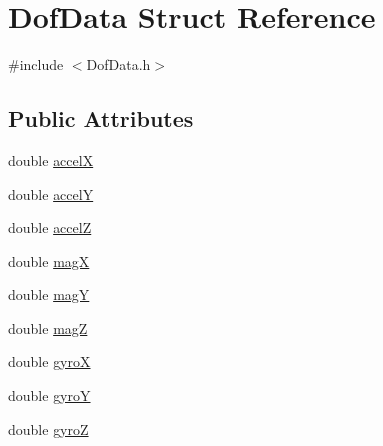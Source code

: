 \hypertarget{struct_dof_data}{\section{Dof\-Data Struct Reference}
\label{struct_dof_data}
}


{\ttfamily \#include $<$Dof\-Data.\-h$>$}

\subsection*{Public Attributes}
\begin{DoxyCompactItemize}
\item 
double \hyperlink{struct_dof_data_a428cfa39fa295506315a15dd7aec6af9}{accel\-X}
\item 
double \hyperlink{struct_dof_data_aff5dae3fd5404b3655b2848b720e6d4e}{accel\-Y}
\item 
double \hyperlink{struct_dof_data_a2be73a3c7df7e25639b04d8807cb738f}{accel\-Z}
\item 
double \hyperlink{struct_dof_data_aa246a750759f0e35fc1c6d51bf3171c9}{mag\-X}
\item 
double \hyperlink{struct_dof_data_a68d222fd9ddebf38e7d2248d5b346bbb}{mag\-Y}
\item 
double \hyperlink{struct_dof_data_ae2583a4b6e851d1f3640a94028799231}{mag\-Z}
\item 
double \hyperlink{struct_dof_data_a9edd0b04a8b14a336b8c02ca464bc9d8}{gyro\-X}
\item 
double \hyperlink{struct_dof_data_a6303a0c2d3c7990323908b437f1c8205}{gyro\-Y}
\item 
double \hyperlink{struct_dof_data_ac1d0c1061bbf2b5e70976227e713cddf}{gyro\-Z}
\end{DoxyCompactItemize}


